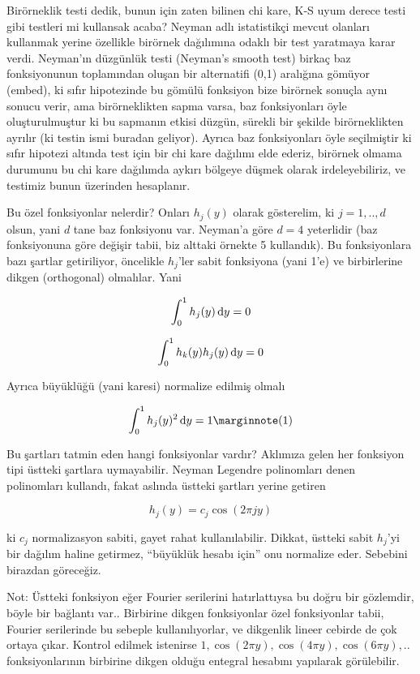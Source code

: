 \documentclass[12pt,fleqn]{article}\usepackage{../../common}
\begin{document}
Birörneklik testi dedik, bunun için zaten bilinen chi kare, K-S uyum derece
testi gibi testleri mi kullansak acaba? Neyman adlı istatistikçi mevcut
olanları kullanmak yerine özellikle birörnek dağılımına odaklı bir test
yaratmaya karar verdi. Neyman'ın düzgünlük testi (Neyman's smooth test)
birkaç baz fonksiyonunun toplamından oluşan bir alternatifi (0,1) aralığına
gömüyor (embed), ki sıfır hipotezinde bu gömülü fonksiyon bize birörnek
sonuçla aynı sonucu verir, ama birörneklikten sapma varsa, baz
fonksiyonları öyle oluşturulmuştur ki bu sapmanın etkisi düzgün, sürekli
bir şekilde birörneklikten ayrılır (ki testin ismi buradan geliyor). Ayrıca
baz fonksiyonları öyle seçilmiştir ki sıfır hipotezi altında test için bir
chi kare dağılımı elde ederiz, birörnek olmama durumunu bu chi kare
dağılımda aykırı bölgeye düşmek olarak irdeleyebiliriz, ve testimiz bunun
üzerinden hesaplanır.

Bu özel fonksiyonlar nelerdir? Onları $h_j(y)$ olarak gösterelim, ki $j=1,..,d$
olsun, yani $d$ tane baz fonksiyonu var. Neyman'a göre $d=4$ yeterlidir (baz
fonksiyonuna göre değişir tabii, biz alttaki örnekte 5 kullandık). Bu
fonksiyonlara bazı şartlar getiriliyor, öncelikle $h_j$'ler sabit fonksiyona
(yani 1'e) ve birbirlerine dikgen (orthogonal) olmalılar. Yani

$$ \int_{0}^{1} h_j(y) \,\mathrm{d} y = 0 $$

$$ \int_{0}^{1} h_k(y)h_j(y) \,\mathrm{d} y = 0 $$

Ayrıca büyüklüğü (yani karesi) normalize edilmiş olmalı

$$ 
\int_{0}^{1} h_j(y)^2 \ud y = 1 
\mlabel{1}
$$

Bu şartları tatmin eden hangi fonksiyonlar vardır? Aklımıza gelen her
fonksiyon tipi üstteki şartlara uymayabilir. Neyman Legendre polinomları
denen polinomları kullandı, fakat aslında üstteki şartları yerine getiren

$$ h_j(y) = c_j \cos (2\pi j y) $$

ki $c_j$ normalizasyon sabiti, gayet rahat kullanılabilir. Dikkat, üstteki
sabit $h_j$'yi bir dağılım haline getirmez, ``büyüklük hesabı için'' onu
normalize eder. Sebebini birazdan göreceğiz. 

Not: Üstteki fonksiyon eğer Fourier serilerini hatırlattıysa bu doğru bir
gözlemdir, böyle bir bağlantı var.. Birbirine dikgen fonksiyonlar özel
fonksiyonlar tabii, Fourier serilerinde bu sebeple kullanılıyorlar, ve
dikgenlik lineer cebirde de çok ortaya çıkar. Kontrol edilmek istenirse 
$1, \cos (2\pi y), \cos (4\pi y), \cos (6 \pi y), ..$ fonksiyonlarının birbirine
dikgen olduğu entegral hesabını yapılarak görülebilir. 
\end{document}
